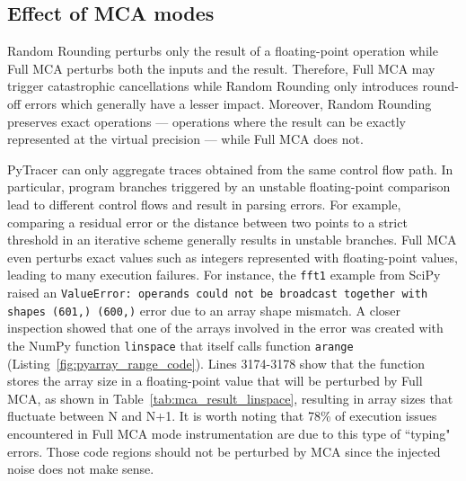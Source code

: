 \documentclass[10pt,journal,compsoc]{IEEEtran}
\newcommand{\pytracer}[0]{PyTracer\xspace}
\begin{document}
\subsection{Effect of MCA modes}
\label{sec:impact_mca_modes}
Random Rounding perturbs only the result of a floating-point operation while
Full MCA perturbs both the inputs and the result. Therefore, Full MCA may
trigger catastrophic cancellations while Random Rounding only introduces
round-off errors which generally have a lesser impact. Moreover, Random Rounding
preserves exact operations --- operations where the result can be exactly
represented at the virtual precision --- while Full MCA does not.

\pytracer can only aggregate traces obtained from the same control flow path. In
particular, program branches triggered by an unstable floating-point comparison
lead to different control flows and result in parsing errors. For example,
comparing a residual error or the distance between two points to a strict
threshold in an iterative scheme generally results in unstable branches. Full
MCA even perturbs exact values such as integers represented with floating-point
values, leading to many execution failures. For instance, the \texttt{fft1}
example from SciPy raised an \texttt{ValueError: operands could not be broadcast
    together with shapes (601,) (600,)} error due to an array shape mismatch. A
closer inspection showed that one of the arrays involved in the error was
created with the NumPy function \texttt{linspace} that itself calls function
\texttt{arange} (Listing~\ref{fig:pyarray_range_code}). Lines 3174-3178 show
that the function stores the array size in a floating-point value that will be
perturbed by Full MCA, as shown in Table~\ref{tab:mca_result_linspace},
resulting in array sizes that fluctuate between N and N+1. It is worth noting
that 78\% of execution issues encountered in Full MCA mode instrumentation are
due to this type of ``typing" errors.  
Those code regions should not be perturbed by MCA since the injected noise does
not make sense.
\end{document}
